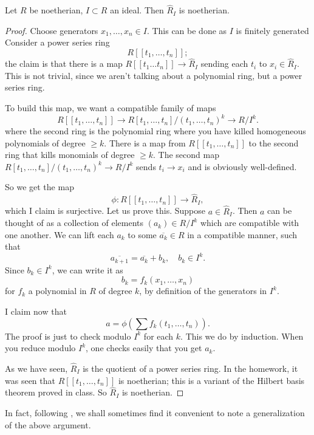 \begin{proposition} 
Let $R$ be noetherian, $I \subset R$ an ideal. Then $\hat{R}_I$ is noetherian.
\end{proposition} 
\begin{proof} 
Choose generators $x_1, \dots, x_n \in I$. This can be done as $I$ is finitely generated
Consider a power series ring 
\[ R[[t_1, \dots, t_n]] ; \]
the claim is that there is a map $R[[t_1\dots t_n]] \to \hat{R}_I$ sending each
$t_i$ to $x_i  \in \hat{R}_I$. This is not trivial, since we aren't talking
about a polynomial ring, but a power series ring. 

To build this map, we  want a compatible family of maps
\[ R[[t_1, \dots, t_n]] \to R[t_1, \dots, t_n]/(t_1, \dots, t_n)^k  \to R/I^k.  \]
where the second ring is the polynomial ring where you have killed homogeneous
polynomials of degree $\geq k$. There is a map from $R[[t_1, \dots, t_n]]$ to
the second ring that kills monomials of degree $ \geq k$. The second map
$R[t_1, \dots, t_n]/(t_1, \dots, t_n)^k \to R/I^k$ sends $t_i \to x_i$ and is
obviously well-defined.

So we get the map
\[ \phi:  R[[t_1, \dots, t_n]] \to \hat{R}_I ,  \]
which I claim is surjective. Let us prove this. Suppose $a \in \hat{R}_I$. Then $a$ can be thought
of as a collection of elements $(a_k) \in R/I^k$ which are compatible with one
another.  We can lift each $a_k$ to some $\overline{a_k} \in R$ in a
compatible manner, such that
\[ \overline{a_{k+1}} = \overline{a_k} + b_k, \quad b_k \in I^k.  \]
Since $b_k \in I^k$, we can write it as
\[ b_k = f_k(x_1, \dots, x_n)  \]
for $f_k$ a polynomial in $R$ of degree $k$, by definition of the generators in
$I^k$. 

I claim now that 
\[ a = \phi\left( \sum f_k(t_1, \dots, t_n)  \right).  \]
The proof is just to check modulo $I^k$ for each $k$. This we  do by induction.
When you reduce  modulo $I^k$, one checks easily that you get $a_k$.

As we have seen, $\hat{R}_I$ is the quotient of a power series ring. In the
homework, it was seen that $R[[t_1, \dots, t_n]]$ is noetherian; this is a
variant of the Hilbert basis theorem proved in class. So $\hat{R}_I$ is
noetherian.
\end{proof} 


In fact, following \cite{Se65}, we shall sometimes find it convenient to note a generalization of the
above argument.

